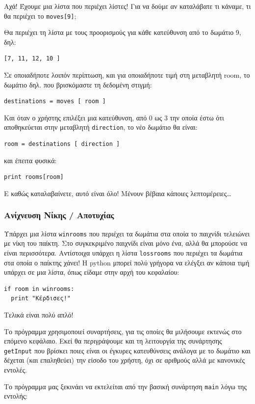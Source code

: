Αχά! Έχουμε μια λίστα που περιέχει λίστες! Για να δούμε αν καταλάβατε τι
κάναμε, τι θα περιέχει το {\tt moves[9]};

Θα περιέχει τη λίστα με τους προορισμούς για κάθε κατεύθυνση από το δωμάτιο
9, δηλ:
%
\begin{verbatim}
[7, 11, 12, 10 ]
\end{verbatim}
%
Σε οποιαδήποτε λοιπόν περίπτωση, και για οποιαδήποτε τιμή στη μεταβλητή
room, το δωμάτιο δηλ. που βρισκόμαστε τη δεδομένη στιγμή:
%
\begin{verbatim}
destinations = moves [ room ]
\end{verbatim}
%
Και όταν ο χρήστης επιλέξει μια κατεύθυνση, από 0 ως 3 την οποία έστω ότι
αποθηκεύεται στην μεταβλητή {\tt direction}, το νέο δωμάτιο θα είναι:
%
\begin{verbatim}
room = destinations [ direction ]
\end{verbatim}
%
και έπειτα φυσικά:
%
\begin{verbatim}
print rooms[room]
\end{verbatim}
%
Ε καθώς καταλαβαίνετε, αυτό είναι όλο! Μένουν βέβαια κάποιες λεπτομέρειες\ldots
%
\subsubsection{Ανίχνευση Νίκης / Αποτυχίας}
%
Υπάρχει μια λίστα {\tt winrooms} που περιέχει τα δωμάτια στα οποία το παιχνίδι
τελειώνει με νίκη του παίκτη. Στο συγκεκριμένο παιχνίδι είναι μόνο ένα, αλλά
θα μπορούσε να είναι περισσότερα. Αντίστοιχα υπάρχει η λίστα {\tt lossrooms} που
περιέχει τα δωμάτια στα οποία ο παίκτης χάνει! Η python μπορεί πολύ γρήγορα
να ελέγξει αν κάποια τιμή υπάρχει σε μια λίστα, όπως είδαμε στην αρχή του
κεφαλαίου:

\begin{verbatim}
if room in winrooms:
  print "Κέρδισες!"
\end{verbatim}

Τελικά είναι πολύ απλό!

Το πρόγραμμα χρησιμοποιεί συναρτήσεις, για τις οποίες θα μιλήσουμε εκτενώς
στο επόμενο κεφάλαιο. Εκεί θα περιγράψουμε και τη λειτουργία της συνάρτησης
{\tt getInput} που βρίσκει ποιες είναι οι έγκυρες κατευθύνσεις ανάλογα με το
δωμάτιο και δέχεται (και επαληθεύει) την είσοδο του χρήστη, όχι σε αριθμούς
αλλά με κανονικές εντολές.

Το πρόγραμμα μας ξεκινάει να εκτελείται από την βασική συνάρτηση {\tt main} λόγω
της εντολής:

